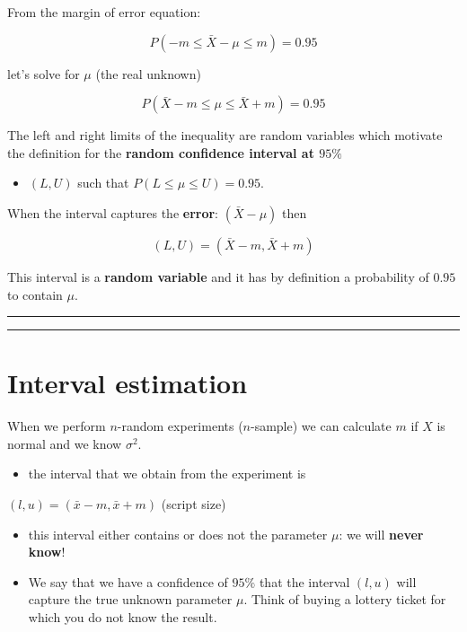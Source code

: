 \documentclass[
]{book}
\providecommand{\tightlist}{%
  \setlength{\itemsep}{0pt}\setlength{\parskip}{0pt}}
\begin{document}
From the margin of error equation:

\[P(-m \leq \bar{X} - \mu \leq  m)=0.95\]

let's solve for \(\mu\) (the real unknown)

\[P(\bar{X} - m \leq \mu \leq \bar{X} + m)=0.95\]

The left and right limits of the inequality are random variables which motivate the definition for the \textbf{random confidence interval at \(95\%\)}

\begin{itemize}
\tightlist
\item
  \((L,U)\) such that \(P(L \leq \mu \leq U )=0.95\).
\end{itemize}

When the interval captures the \textbf{error}: \((\bar{X}-\mu)\) then

\[(L,U)=(\bar{X} - m,\bar{X} + m)\]

This interval is a \textbf{random variable} and it has by definition a probability of \(0.95\) to contain \(\mu\).

\begin{center}\rule{0.5\linewidth}{0.5pt}\end{center}

\begin{center}\rule{0.5\linewidth}{0.5pt}\end{center}

\hypertarget{interval-estimation-3}{%
\section{Interval estimation}\label{interval-estimation-3}}

When we perform \(n\)-random experiments (\(n\)-sample) we can calculate \(m\) if \(X\) is normal and we know \(\sigma^2\).

\begin{itemize}
\tightlist
\item
  the interval that we obtain from the experiment is
\end{itemize}

\((l,u)=(\bar{x} - m,\bar{x} + m)\) (script size)

\begin{itemize}
\item
  this interval either contains or does not the parameter \(\mu\): we will \textbf{never know}!
\item
  We say that we have a confidence of \(95\%\) that the interval \((l,u)\) will capture the true unknown parameter \(\mu\). Think of buying a lottery ticket for which you do not know the result.
\end{itemize}
\end{document}
